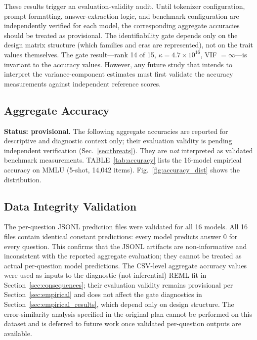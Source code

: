\documentclass{ieeeaccess}
\theoremstyle{definition}
\theoremstyle{plain}
\begin{document}
These results trigger an evaluation-validity audit. Until tokenizer configuration, prompt formatting, answer-extraction logic, and benchmark configuration are independently verified for each model, the corresponding aggregate accuracies should be treated as provisional. The identifiability gate depends only on the design matrix structure (which families and eras are represented), not on the trait values themselves. The gate result---rank 14 of 15, $\kappa = 4.7 \times 10^{16}$, VIF $= \infty$---is invariant to the accuracy values. However, any future study that intends to interpret the variance-component estimates must first validate the accuracy measurements against independent reference scores.

 \subsection{Aggregate Accuracy}
\textbf{Status: provisional.} The following aggregate accuracies are reported for descriptive and diagnostic context only; their evaluation validity is pending independent verification (Sec.~\ref{sec:threats}). They are \emph{not} interpreted as validated benchmark measurements.
TABLE~\ref{tab:accuracy} lists the 16-model empirical accuracy on MMLU (5-shot, 14,042 items). Fig.~\ref{fig:accuracy_dist} shows the distribution.


\subsection{Data Integrity Validation}
The per-question JSONL prediction files were validated for all 16 models. All 16 files contain identical constant predictions: every model predicts answer 0 for every question. This confirms that the JSONL artifacts are non-informative and inconsistent with the reported aggregate evaluation; they cannot be treated as actual per-question model predictions. The CSV-level aggregate accuracy values were used as inputs to the diagnostic (not inferential) REML fit in Section~\ref{sec:consequences}; their evaluation validity remains provisional per Section~\ref{sec:empirical} and does not affect the gate diagnostics in Section~\ref{sec:empirical_results}, which depend only on design structure. The error-similarity analysis specified in the original plan cannot be performed on this dataset and is deferred to future work once validated per-question outputs are available.
\end{document}
